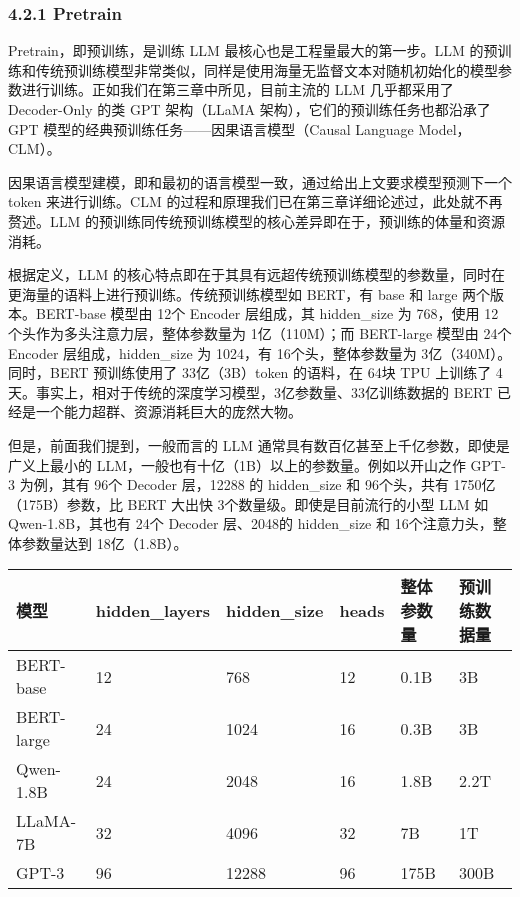 \documentclass[
]{article}
\begin{document}
\subsubsection{4.2.1 Pretrain}\label{pretrain}

Pretrain，即预训练，是训练 LLM 最核心也是工程量最大的第一步。LLM
的预训练和传统预训练模型非常类似，同样是使用海量无监督文本对随机初始化的模型参数进行训练。正如我们在第三章中所见，目前主流的
LLM 几乎都采用了 Decoder-Only 的类 GPT 架构（LLaMA
架构），它们的预训练任务也都沿承了 GPT
模型的经典预训练任务------因果语言模型（Causal Language Model，CLM）。

因果语言模型建模，即和最初的语言模型一致，通过给出上文要求模型预测下一个
token 来进行训练。CLM
的过程和原理我们已在第三章详细论述过，此处就不再赘述。LLM
的预训练同传统预训练模型的核心差异即在于，预训练的体量和资源消耗。

根据定义，LLM
的核心特点即在于其具有远超传统预训练模型的参数量，同时在更海量的语料上进行预训练。传统预训练模型如
BERT，有 base 和 large 两个版本。BERT-base 模型由 12个 Encoder
层组成，其 hidden\_size 为 768，使用
12个头作为多头注意力层，整体参数量为 1亿（110M）；而 BERT-large 模型由
24个 Encoder 层组成，hidden\_size 为 1024，有 16个头，整体参数量为
3亿（340M）。同时，BERT 预训练使用了 33亿（3B）token 的语料，在 64块 TPU
上训练了
4天。事实上，相对于传统的深度学习模型，3亿参数量、33亿训练数据的 BERT
已经是一个能力超群、资源消耗巨大的庞然大物。

但是，前面我们提到，一般而言的 LLM
通常具有数百亿甚至上千亿参数，即使是广义上最小的
LLM，一般也有十亿（1B）以上的参数量。例如以开山之作 GPT-3 为例，其有
96个 Decoder 层，12288 的 hidden\_size 和 96个头，共有
1750亿（175B）参数，比 BERT 大出快 3个数量级。即使是目前流行的小型 LLM
如 Qwen-1.8B，其也有 24个 Decoder 层、2048的 hidden\_size 和
16个注意力头，整体参数量达到 18亿（1.8B）。

\begin{longtable}[]{@{}llllll@{}}
\toprule\noalign{}
模型 & hidden\_layers & hidden\_size & heads & 整体参数量 &
预训练数据量 \\
\midrule\noalign{}
\endhead
\bottomrule\noalign{}
\endlastfoot
BERT-base & 12 & 768 & 12 & 0.1B & 3B \\
BERT-large & 24 & 1024 & 16 & 0.3B & 3B \\
Qwen-1.8B & 24 & 2048 & 16 & 1.8B & 2.2T \\
LLaMA-7B & 32 & 4096 & 32 & 7B & 1T \\
GPT-3 & 96 & 12288 & 96 & 175B & 300B \\
\end{longtable}
\end{document}
